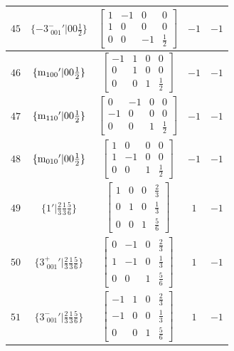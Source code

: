 \documentclass[fleqn,8pt]{jsarticle}
\begin{document}
\begin{longtable}{ccccc}
$ 45 $ & $ \{-3^{-}_{\,\,001}{}'|0 0 \frac{1}{2}\} $ & $ \begin{bmatrix} 1 & -1 & 0 & 0 \\ 1 & 0 & 0 & 0 \\ 0 & 0 & -1 & \frac{1}{2} \end{bmatrix} $ & $ -1 $ & $ -1 $ \\ \hline
$ 46 $ & $ \{{\rm m}_{100}{}'|0 0 \frac{1}{2}\} $ & $ \begin{bmatrix} -1 & 1 & 0 & 0 \\ 0 & 1 & 0 & 0 \\ 0 & 0 & 1 & \frac{1}{2} \end{bmatrix} $ & $ -1 $ & $ -1 $ \\ \hline
$ 47 $ & $ \{{\rm m}_{110}{}'|0 0 \frac{1}{2}\} $ & $ \begin{bmatrix} 0 & -1 & 0 & 0 \\ -1 & 0 & 0 & 0 \\ 0 & 0 & 1 & \frac{1}{2} \end{bmatrix} $ & $ -1 $ & $ -1 $ \\ \hline
$ 48 $ & $ \{{\rm m}_{010}{}'|0 0 \frac{1}{2}\} $ & $ \begin{bmatrix} 1 & 0 & 0 & 0 \\ 1 & -1 & 0 & 0 \\ 0 & 0 & 1 & \frac{1}{2} \end{bmatrix} $ & $ -1 $ & $ -1 $ \\ \hline
$ 49 $ & $ \{1{}'|\frac{2}{3} \frac{1}{3} \frac{5}{6}\} $ & $ \begin{bmatrix} 1 & 0 & 0 & \frac{2}{3} \\ 0 & 1 & 0 & \frac{1}{3} \\ 0 & 0 & 1 & \frac{5}{6} \end{bmatrix} $ & $ 1 $ & $ -1 $ \\ \hline
$ 50 $ & $ \{3^{+}_{\,\,001}{}'|\frac{2}{3} \frac{1}{3} \frac{5}{6}\} $ & $ \begin{bmatrix} 0 & -1 & 0 & \frac{2}{3} \\ 1 & -1 & 0 & \frac{1}{3} \\ 0 & 0 & 1 & \frac{5}{6} \end{bmatrix} $ & $ 1 $ & $ -1 $ \\ \hline
$ 51 $ & $ \{3^{-}_{\,\,001}{}'|\frac{2}{3} \frac{1}{3} \frac{5}{6}\} $ & $ \begin{bmatrix} -1 & 1 & 0 & \frac{2}{3} \\ -1 & 0 & 0 & \frac{1}{3} \\ 0 & 0 & 1 & \frac{5}{6} \end{bmatrix} $ & $ 1 $ & $ -1 $ \\ \hline

\end{longtable}
\end{document}
